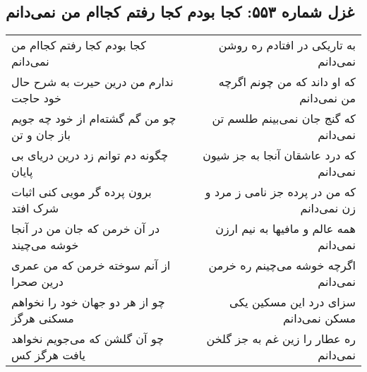 \begin{center}
\section*{غزل شماره ۵۵۳: کجا بودم کجا رفتم کجاام من نمی‌دانم}
\label{sec:553}
\begin{longtable}{l p{0.5cm} r}
کجا بودم کجا رفتم کجاام من نمی‌دانم
&&
به تاریکی در افتادم ره روشن نمی‌دانم
\\
ندارم من درین حیرت به شرح حال خود حاجت
&&
که او داند که من چونم اگرچه من نمی‌دانم
\\
چو من گم گشته‌ام از خود چه جویم باز جان و تن
&&
که گنج جان نمی‌بینم طلسم تن نمی‌دانم
\\
چگونه دم توانم زد درین دریای بی پایان
&&
که درد عاشقان آنجا به جز شیون نمی‌دانم
\\
برون پرده گر مویی کنی اثبات شرک افتد
&&
که من در پرده جز نامی ز مرد و زن نمی‌دانم
\\
در آن خرمن که جان من در آنجا خوشه می‌چیند
&&
همه عالم و مافیها به نیم ارزن نمی‌دانم
\\
از آنم سوخته خرمن که من عمری درین صحرا
&&
اگرچه خوشه می‌چینم ره خرمن نمی‌دانم
\\
چو از هر دو جهان خود را نخواهم مسکنی هرگز
&&
سزای درد این مسکین یکی مسکن نمی‌دانم
\\
چو آن گلشن که می‌جویم نخواهد یافت هرگز کس
&&
ره عطار را زین غم به جز گلخن نمی‌دانم
\\
\end{longtable}
\end{center}

